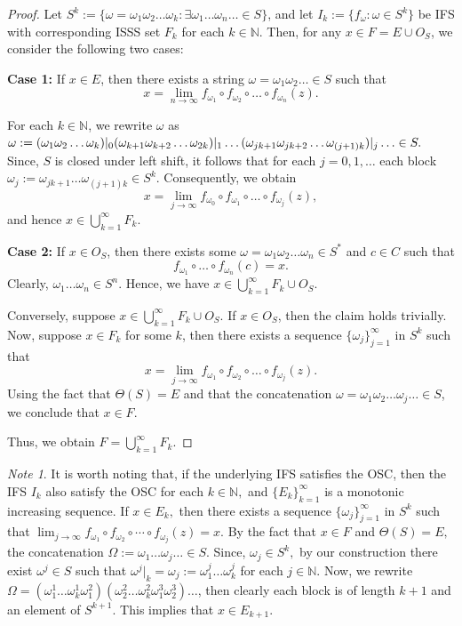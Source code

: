 \documentclass[12pt,oneside,reqno]{amsart}
\theoremstyle{definition}
\theoremstyle{remark}
\newtheorem{note}[theorem]{Note}
\begin{document}
\begin{proof}
Let $S^k :=\{\omega = \omega_1 \omega_2\ldots \omega_k : \exists \omega_1 \ldots \omega_n\ldots \in S\}$, and
let $I_k := \{ f_{\omega} : \omega \in S^k \}$ be IFS with corresponding ISSS set $F_k$ for each $k \in \mathbb{N}$. Then, for any $ x \in F = E \cup O_S$, we consider the following two cases:

\textbf{Case 1:} If $ x \in E$, then there exists a string $ \omega = \omega_1 \omega_2 \ldots \in S$ such that
\[
x = \lim_{n \to \infty} f_{\omega_1} \circ f_{\omega_2} \circ \ldots \circ f_{\omega_n} (z).
\]

For each $k \in \mathbb{N}$, we rewrite $\omega$ as $\omega:= (\omega_1 \omega_2 \ldots \omega_k)|_{0}(\omega_{k+1}\omega_{k+2}\ldots \omega_{2k})|_{1}\ldots (\omega_{jk+1}\omega_{jk+2}\ldots \\ \omega_{(j+1)k})|_{j}\ldots\in S.$ Since, $S$ is closed under left shift, it follows that for each $j= 0,1,\ldots$ each block $\omega_j:=\omega_{jk+1} \ldots \omega_{(j+1)k} \in S^k$. Consequently, we obtain
\[
x = \lim_{j \to \infty} f_{\omega_0} \circ f_{\omega_1} \circ \ldots \circ f_{\omega_j} (z),
\]
and hence $x \in \bigcup_{k=1}^{\infty} F_k$.

\textbf{Case 2:} If $x \in O_S$, then there exists some $\omega = \omega_1 \omega_2 \ldots \omega_n \in S^*$ and $c \in C$ such that
\[
f_{\omega_1} \circ \ldots \circ f_{\omega_n}(c) = x.
\]
Clearly, $\omega_1 \ldots \omega_n \in S^n$. Hence, we have $x \in \bigcup_{k=1}^{\infty} F_k \cup O_S$.

Conversely, suppose $x \in \bigcup_{k=1}^{\infty} F_k \cup O_S$. If $x\in O_S$, then the claim holds trivially. Now, suppose $x \in F_k$ for some $k$, then there exists a sequence $\{\omega_j\}_{j=1}^{\infty}$ in $S^k$ such that
\[
x = \lim_{j \to \infty} f_{\omega_1} \circ f_{\omega_2} \circ \ldots \circ f_{\omega_j} (z).
\]
Using the fact that $\Theta(S) = E$ and that the concatenation $\omega = \omega_1 \omega_2 \ldots \omega_j\ldots \in S$, we conclude that $x \in F$.

Thus, we obtain $F = \bigcup_{k=1}^{\infty} F_k$.
\end{proof}
\begin{note}
    It is worth noting that, if the underlying IFS satisfies the OSC, then the IFS $I_k$ also satisfy the OSC for each $k\in \mathbb{N},$ and $\{E_k\}_{k=1}^{\infty}$ is a monotonic increasing sequence. If $x \in E_k,$ then there exists a sequence $\{\omega_j\}_{j=1}^{\infty}$ in $S^{k}$ such that $\lim_{j \to \infty} f_{\omega_1}\circ f_{\omega_2}\circ \cdots \circ f_{\omega_j}(z)=x.$
    By the fact that $x \in F$ and $\Theta(S) = E,$  the concatenation $\Omega :=\omega_1\ldots \omega_j\ldots \in S.$ Since, $\omega_j \in S^{k},$ by our construction there exist $\omega^j \in S$ such that $\omega^j|_{k}= \omega_j := \omega^j_1\ldots \omega^{j}_k$ for each $j\in \mathbb{N}.$ Now, we rewrite $\Omega=(\omega^1_1\ldots\omega^1_{k} \omega^2_{1})(\omega^2_2 \ldots \omega^2_{k}\omega^3_{1}\omega^3_{2})\ldots$, then clearly each block is of length $k+1$ and an element of $S^{k+1}.$ This implies that $x \in E_{k+1}.$
\end{note}
\end{document}

